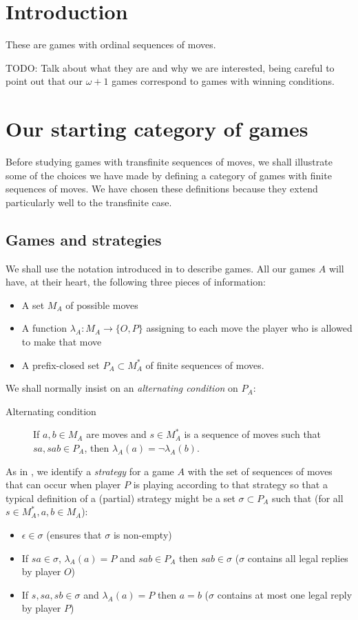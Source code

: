 \documentclass[11pt]{article} %
\theoremstyle{plain} %
\theoremstyle{definition} %
\theoremstyle{note}
\theoremstyle{exercisestyle}
\newcommand*\from{\colon}
\newcommand{\cmap}[3]{#1\from{}#2\to{}#3}
\newcommand{\OP}{\{O,P\}}
\newcommand{\emptyplay}{\epsilon}
\begin{document}
\section{Introduction}

These are games with ordinal sequences of moves.

TODO: Talk about what they are and why we are interested, being careful to point out that our $\omega+1$ games correspond to games with winning conditions.

\section{Our starting category of games}

Before studying games with transfinite sequences of moves, we shall illustrate some of the choices we have made by defining a category of games with finite sequences of moves.  We have chosen these definitions because they extend particularly well to the transfinite case.  

\subsection{Games and strategies}

We shall use the notation introduced in \cite{abramskyjagadeesangames} to describe games.  All our games $A$ will have, at their heart, the following three pieces of information:
\begin{itemize}
  \item A set $M_A$ of possible moves
  \item A function $\cmap{\lambda_A}{M_A}{\OP}$ assigning to each move the player who is allowed to make that move
  \item A prefix-closed set $P_A\subset M_A^*$ of finite sequences of moves.
\end{itemize}
We shall normally insist on an \emph{alternating condition} on $P_A$:
\begin{description}
  \item[Alternating condition] If $a,b\in M_A$ are moves and $s\in M_A^*$ is a sequence of moves such that $sa, sab\in P_A$, then $\lambda_A(a)=\neg\lambda_A(b)$.
\end{description}

As in \cite{abramskyjagadeesangames}, we identify a \emph{strategy} for a game $A$ with the set of sequences of moves that can occur when player $P$ is playing according to that strategy so that a typical definition of a (partial) strategy might be a set $\sigma\subset P_A$ such that (for all $s\in M_A^*, a,b\in M_A$):
\begin{itemize}
  \item $\emptyplay\in\sigma$ (ensures that $\sigma$ is non-empty)
  \item If $sa\in\sigma$, $\lambda_A(a)=P$ and $sab\in P_A$ then $sab\in\sigma$ ($\sigma$ contains all legal replies by player $O$)
  \item If $s,sa,sb\in\sigma$ and $\lambda_A(a)=P$ then $a=b$ ($\sigma$ contains at most one legal reply by player $P$)
\end{itemize}
\end{document}
